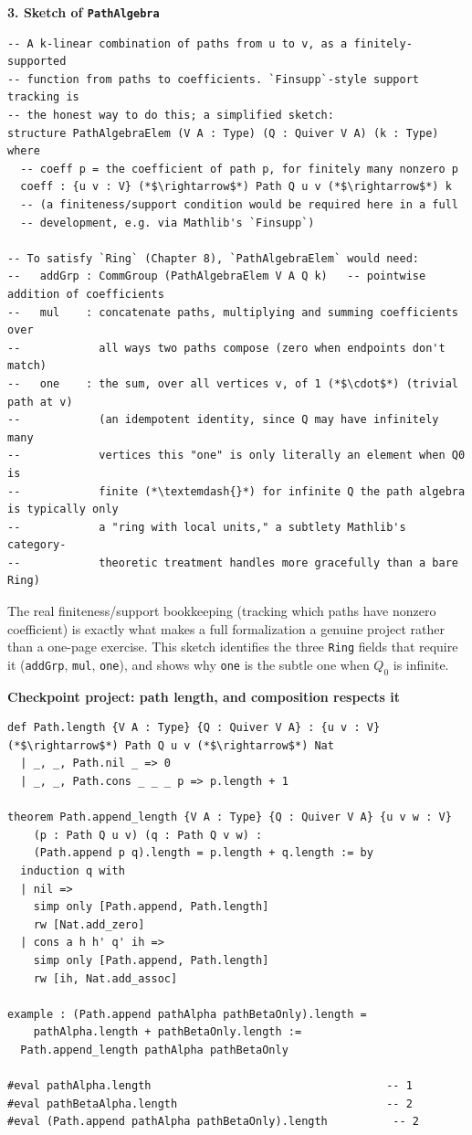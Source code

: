 \textbf{3. Sketch of \texttt{PathAlgebra}}

\begin{lstlisting}
-- A k-linear combination of paths from u to v, as a finitely-supported
-- function from paths to coefficients. `Finsupp`-style support tracking is
-- the honest way to do this; a simplified sketch:
structure PathAlgebraElem (V A : Type) (Q : Quiver V A) (k : Type) where
  -- coeff p = the coefficient of path p, for finitely many nonzero p
  coeff : {u v : V} (*$\rightarrow$*) Path Q u v (*$\rightarrow$*) k
  -- (a finiteness/support condition would be required here in a full
  -- development, e.g. via Mathlib's `Finsupp`)

-- To satisfy `Ring` (Chapter 8), `PathAlgebraElem` would need:
--   addGrp : CommGroup (PathAlgebraElem V A Q k)   -- pointwise addition of coefficients
--   mul    : concatenate paths, multiplying and summing coefficients over
--            all ways two paths compose (zero when endpoints don't match)
--   one    : the sum, over all vertices v, of 1 (*$\cdot$*) (trivial path at v)
--            (an idempotent identity, since Q may have infinitely many
--            vertices this "one" is only literally an element when Q0 is
--            finite (*\textemdash{}*) for infinite Q the path algebra is typically only
--            a "ring with local units," a subtlety Mathlib's category-
--            theoretic treatment handles more gracefully than a bare Ring)
\end{lstlisting}

The real finiteness/support bookkeeping (tracking which paths have nonzero coefficient) is exactly what makes a full formalization a genuine project rather than a one-page exercise. This sketch identifies the three \texttt{Ring} fields that require it (\texttt{addGrp}, \texttt{mul}, \texttt{one}), and shows why \texttt{one} is the subtle one when \(Q_0\) is infinite.

\textbf{Checkpoint project: path length, and composition respects it}

\begin{lstlisting}
def Path.length {V A : Type} {Q : Quiver V A} : {u v : V} (*$\rightarrow$*) Path Q u v (*$\rightarrow$*) Nat
  | _, _, Path.nil _ => 0
  | _, _, Path.cons _ _ _ p => p.length + 1

theorem Path.append_length {V A : Type} {Q : Quiver V A} {u v w : V}
    (p : Path Q u v) (q : Path Q v w) :
    (Path.append p q).length = p.length + q.length := by
  induction q with
  | nil =>
    simp only [Path.append, Path.length]
    rw [Nat.add_zero]
  | cons a h h' q' ih =>
    simp only [Path.append, Path.length]
    rw [ih, Nat.add_assoc]

example : (Path.append pathAlpha pathBetaOnly).length =
    pathAlpha.length + pathBetaOnly.length :=
  Path.append_length pathAlpha pathBetaOnly

#eval pathAlpha.length                                    -- 1
#eval pathBetaAlpha.length                                -- 2
#eval (Path.append pathAlpha pathBetaOnly).length          -- 2
\end{lstlisting}

